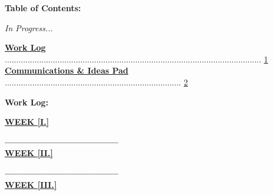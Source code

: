 \documentclass[11pt]{article}
\begin{document}
\begin{blackbox}{\begin{center}\Large\textbf{Table of Contents:}\end{center}}
\begin{center}\large\textit{In Progress...}\end{center}

\large\textbf{\hyperlink{page.1}{Work Log}} ................................................................................................................ \hyperlink{page.1}{1}\\
\large\textbf{\hyperlink{page.2}{Communications \& Ideas Pad}} ............................................................................. \hyperlink{page.2}{2}
\end{blackbox}

\begin{blackbox}{\begin{center}\Large\textbf{Work Log:}\end{center}}
\hspace{-0.3cm}\small\textbf{\hyperlink{page.3}{WEEK [I.]}}
\vspace{0.25em}

\normalsize\indent \vline\textbf{------------}\hyperlink{page.3}{}\textbf{------}\hyperlink{page.3}{}\textbf{------}\hyperlink{page.5}{}\textbf{------}\hyperlink{page.7}{}\textbf{------}\hyperlink{page.7}{} \\

\vspace{-1em}
\hspace{-0.3cm}\small\textbf{\hyperlink{page.8}{WEEK [II.]}}
\vspace{0.25em}

\normalsize\indent \vline\textbf{------------}\textbf{------}\hyperlink{page.8}{}\textbf{------}\hyperlink{page.10}{}\textbf{------}\hyperlink{page.11}{}\textbf{------}\hyperlink{page.13}{} \\

\vspace{-1em}
\hspace{-0.3cm}\small\hyperlink{page.14}{\textbf{WEEK [III.]}}
\vspace{0.25em}


\end{blackbox}
\end{document}
